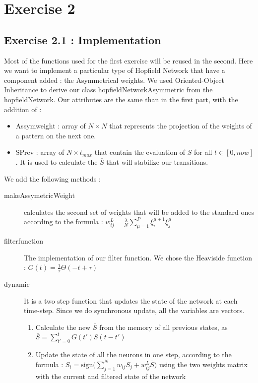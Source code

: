 \section{Exercise 2}

\subsection{Exercise 2.1 : Implementation}
Most of the functions used for the first exercise will be reused in the second. Here we want to 
implement a particular type of Hopfield Network that have a component added : the Asymmetrical 
weights. We used Oriented-Object Inheritance to derive our class hopfieldNetworkAsymmetric
from the hopfieldNetwork. Our attributes are the same than in the first part, with the addition
of :
\begin{itemize}
\item Assymweight : array of $N\times N$ that represents the projection of the weights of a 
pattern on the next one.
\item SPrev : array of $N \times t_{max}$ that contain the evaluation of $S$ for all $t \in
 [0, now]$. It is used to calculate the $\overline{S}$ that will stabilize our transitions.
\end{itemize}

We add the following methods :
\begin{description}
\item [makeAssymetricWeight] calculates the second set of weights that will be added to the standard ones according to the formula : 
$w_{ij}^L = \frac{\lambda}{N}\sum_{\mu=1}^P \xi_i^{\mu+1} \xi_j^{\mu}$
\item [filterfunction] The implementation of our filter function. We chose the Heaviside function : $G(t) = \frac{1}{\tau} \Theta (-t + \tau)$
\item[dynamic] It is a two step function that updates the state of the network at each time-step. Since we do synchronous update, all the variables are vectors.
\begin{enumerate}
    \item Calculate the new  $\overline{S}$ from the memory of all previous states, as $\overline{S} = \sum_{t'=0}^{t} G(t')S(t-t')$
    \item Update the state of all the neurons in one step, 
according to the formula : $S_i = \textrm{sign}\big(\sum_{j=1}^N w_{ij}S_j + w_{ij}^L\overline{S} \big)$ using the two weights matrix with the current and filtered state of the network
\end{enumerate}  
\end{description}


